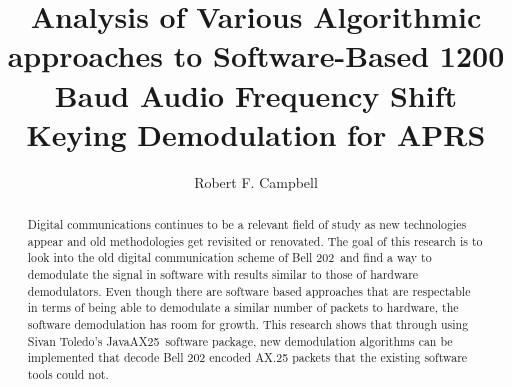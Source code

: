 \documentclass[12pt]{ucthesis}
\begin{document}
\title{Analysis of Various Algorithmic approaches to Software-Based 1200 Baud Audio Frequency Shift Keying Demodulation for APRS}
\author{Robert F. Campbell}
  
 
     
\maketitle

\begin{frontmatter}

\copyrightpage

\committeemembershippage

\begin{abstract}
Digital communications continues to be a relevant field of study as new technologies appear and old methodologies get revisited or renovated. The goal of this research is to look into the old digital communication scheme of Bell 202\,\cite{stauffer1984fsk} and find a way to demodulate the signal in software with results similar to those of hardware demodulators. Even though there are software based approaches that are respectable in terms of being able to demodulate a similar number of packets to hardware, the software demodulation has room for growth. This research shows that through using Sivan Toledo's JavaAX25\,\cite{javax25github} software package, new demodulation algorithms can be implemented that decode Bell 202 encoded AX.25 packets that the existing software tools could not.
\end{abstract}


\tableofcontents
\listoffigures

\end{frontmatter}















\end{document}
